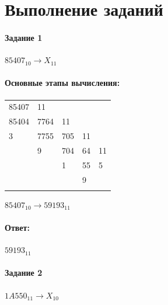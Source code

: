 \documentclass[12pt,onecolumn]{article}
\begin{document}
\section{Выполнение заданий}
\paragraph{Задание 1}


$85407_{10} \rightarrow X_{11}$


\paragraph{Основные этапы вычисления:}
\hfill \break

\FloatBarrier
\begin{table}[h]
\centering
\begin{tabular}{lllll}
\multicolumn{1}{l|}{85407} & 11                        &                          &                         &     \\ 
\cline{2-2}
\multicolumn{1}{l|}{85404} & \multicolumn{1}{l|}{7764} & 11                       &                         &     \\ 
\cline{1-1}\cline{3-3}
3                          & \multicolumn{1}{l|}{7755} & \multicolumn{1}{l|}{705} & 11                      &     \\ 
\cline{2-2}\cline{4-4}
                           & 9                         & \multicolumn{1}{l|}{704} & \multicolumn{1}{l|}{64} & 11  \\ 
\cline{3-3}\cline{5-5}
                           &                           & 1                        & \multicolumn{1}{l|}{55} & 5   \\ 
\cline{4-4}
                           &                           &                          & 9                       &     \\
                           &                           &                          &                         &    
\end{tabular}
\end{table}
\FloatBarrier
$85407_{10} \rightarrow 59193_{11}$
\paragraph{Ответ:}
$59193_{11}$
\paragraph{Задание 2}
$1A550_{11} \rightarrow X_{10}$
\end{document}
